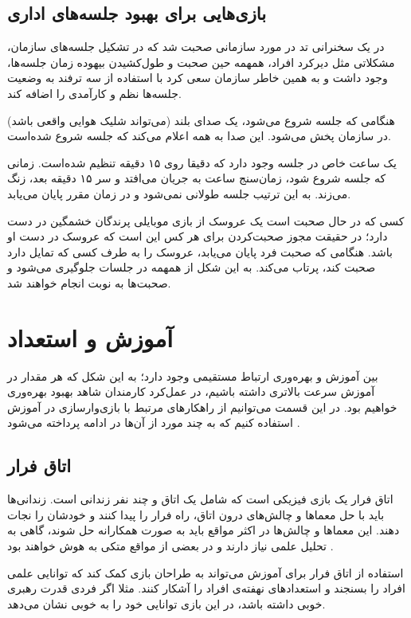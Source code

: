 \subsection{بازی‌هایی برای بهبود جلسه‌های اداری}
در یک سخنرانی تد \cite{tedx} در مورد سازمانی صحبت شد که در تشکیل جلسه‌های سازمان، مشکلاتی مثل دیرکرد افراد، همهمه حین صحبت و طول‌کشیدن بیهوده زمان جلسه‌ها، وجود داشت و به همین خاطر سازمان سعی کرد با استفاده از سه ترفند به وضعیت جلسه‌ها نظم و کارآمدی را اضافه کند.
\begin{trick}
هنگامی که جلسه شروع می‌شود، یک صدای بلند (می‌تواند شلیک هوایی واقعی باشد) در سازمان پخش می‌شود. این صدا به همه اعلام می‌کند که جلسه شروع شده‌است.
\end{trick}
\begin{trick}
یک ساعت خاص در جلسه وجود دارد که دقیقا روی ۱۵ دقیقه تنظیم شده‌است. زمانی که جلسه شروع شود، زمان‌سنج ساعت به جریان می‌افتد و سر ۱۵ دقیقه بعد، زنگ می‌زند. به این ترتیب جلسه طولانی نمی‌شود و در زمان مقرر پایان می‌یابد.
\end{trick}
\begin{trick}
کسی که در حال صحبت است یک عروسک از بازی موبایلی پرندگان خشمگین در دست دارد؛ در حقیقت مجوز صحبت‌کردن برای هر کس این است که عروسک در دست او باشد. هنگامی که صحبت فرد پایان می‌یابد، عروسک را به طرف کسی که تمایل دارد صحبت کند، پرتاب می‌کند. به این شکل از همهمه در جلسات جلوگیری می‌شود و صحبت‌ها به نوبت انجام خواهند شد.
\end{trick}
\section{آموزش و استعداد}
بین آموزش و بهره‌وری ارتباط مستقیمی وجود دارد؛ به این شکل که هر مقدار در آموزش سرعت بالاتری داشته باشیم، در عمل‌کرد کارمندان شاهد بهبود بهره‌وری خواهیم بود. در این قسمت می‌توانیم از راهکارهای مرتبط با بازی‌وارسازی در آموزش استفاده کنیم که به چند مورد از آن‌ها در ادامه پرداخته می‌شود \cite{amiriamin}.
\subsection{اتاق فرار}
اتاق فرار یک بازی فیزیکی است که شامل یک اتاق و چند نفر زندانی است. زندانی‌ها باید با حل معماها و چالش‌های درون اتاق، راه فرار را پیدا کنند و خودشان را نجات دهند. این معماها و چالش‌ها در اکثر مواقع باید به صورت همکارانه حل شوند، گاهی به تحلیل علمی نیاز دارند و در بعضی از مواقع متکی به هوش خواهند بود \cite{atoz}.

استفاده از اتاق فرار برای آموزش می‌تواند به طراحان بازی کمک کند که توانایی علمی افراد را بسنجند و استعدادهای نهفته‌ی افراد را آشکار کنند. مثلا اگر فردی قدرت رهبری خوبی داشته باشد، در این بازی توانایی خود را به خوبی نشان می‌دهد.
